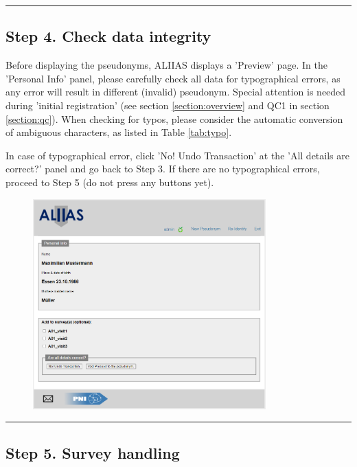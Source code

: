 \par\noindent\rule{\textwidth\color{pniblue}}{0.4pt}
\pagebreak
\subsection*{Step 4. Check data integrity}

Before displaying the pseudonyms, ALIIAS displays a 'Preview' page. In the 'Personal Info' panel, please carefully check all data for typographical errors, as any error will result in different (invalid) pseudonym. Special attention is needed during 'initial registration' (see section \ref{section:overview} and QC1 in section \ref{section:qc}). When checking for typos, please consider the automatic conversion of ambiguous characters, as listed in Table \ref{tab:typo}.

In case of typographical error, click 'No! Undo Transaction' at the 'All details are correct?' panel and go back to Step 3. 
If there are no typographical errors, proceed to Step 5 (do not press any buttons yet).

\begin{figure}[H]
\includegraphics[width=0.8\textwidth]{docs/fig/04_preview.PNG}
\end{figure}

\par\noindent\rule{\textwidth\color{pniblue}}{0.4pt}
\subsection*{Step 5. Survey handling}

